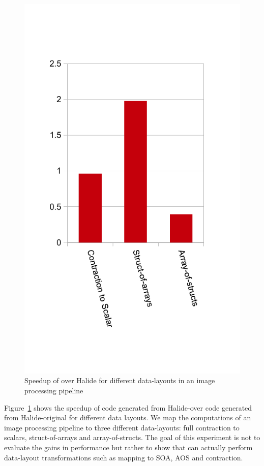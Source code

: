
\begin{figure}
\centering
 \includegraphics[scale=0.7]{./figures/perf2.pdf}
 \caption{Speedup of \framework over Halide for different data-layouts in an image processing pipeline}
 \label{fig:speedup2}
\end{figure}

Figure~\ref{fig:speedup2} shows the speedup of code generated from Halide-\framework over code generated from Halide-original for different data layouts.  We map the computations of an image processing pipeline to three different data-layouts: full contraction to scalars, struct-of-arrays and array-of-structs.  The goal of this experiment is not to evaluate the gains in performance but rather to show that \framework can actually perform data-layout transformations such as mapping to SOA, AOS and contraction.


